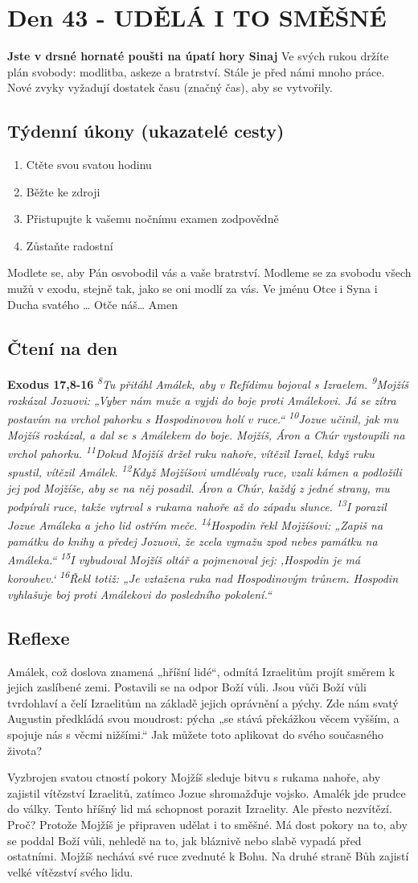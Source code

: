 \documentclass[11pt]{article}
\newcommand{\zacatekSedmyTyden}{
  \textbf{Jste v drsné hornaté poušti na úpatí hory Sinaj} \newline 
  Ve svých rukou držíte plán svobody: modlitba, askeze a bratrství. Stále je před námi mnoho práce. Nové zvyky vyžadují dostatek času (značný čas), aby se vytvořily.

  \subsection*{Týdenní úkony (ukazatelé cesty)}
\begin{enumerate}
  \item Ctěte svou svatou hodinu
  \item Běžte ke zdroji
  \item Přistupujte k vašemu nočnímu examen zodpovědně
  \item Zůstaňte radostní
\end{enumerate}
Modlete se, aby Pán osvobodil vás a vaše bratrství. \newline
Modleme se za svobodu všech mužů v exodu, stejně tak, jako se oni modlí za vás.\newline
Ve jménu Otce i Syna i Ducha svatého …  Otče náš… Amen
}
\begin{document}
\newpage
\section{Den 43 - UDĚLÁ I TO SMĚŠNÉ }
\zacatekSedmyTyden
\subsection*{Čtení na den}
\textbf{Exodus 17,8-16}
\newline
\textit{
\textsuperscript{8}Tu přitáhl Amálek, aby v Refídimu bojoval s Izraelem.
\textsuperscript{9}Mojžíš rozkázal Jozuovi: „Vyber nám muže a vyjdi do boje proti Amálekovi. Já se zítra postavím na vrchol pahorku s Hospodinovou holí v ruce.“
\textsuperscript{10}Jozue učinil, jak mu Mojžíš rozkázal, a dal se s Amálekem do boje. Mojžíš, Áron a Chúr vystoupili na vrchol pahorku.
\textsuperscript{11}Dokud Mojžíš držel ruku nahoře, vítězil Izrael, když ruku spustil, vítězil Amálek.
\textsuperscript{12}Když Mojžíšovi umdlévaly ruce, vzali kámen a podložili jej pod Mojžíše, aby se na něj posadil. Áron a Chúr, každý z jedné strany, mu podpírali ruce, takže vytrval s rukama nahoře až do západu slunce.
\textsuperscript{13}I porazil Jozue Amáleka a jeho lid ostřím meče.
\textsuperscript{14}Hospodin řekl Mojžíšovi: „Zapiš na památku do knihy a předej Jozuovi, že zcela vymažu zpod nebes památku na Amáleka.“
\textsuperscript{15}I vybudoval Mojžíš oltář a pojmenoval jej: ‚Hospodin je má korouhev.‘
\textsuperscript{16}Řekl totiž: „Je vztažena ruka nad Hospodinovým trůnem. Hospodin vyhlašuje boj proti Amálekovi do posledního pokolení.“
}

\subsection*{Reflexe}

Amálek, což doslova znamená „hříšní lidé“, odmítá Izraelitům projít směrem k jejich zaslíbené zemi. Postavili
se na odpor Boží vůli. Jsou vůči Boží vůli tvrdohlaví a čelí Izraelitům na základě jejich oprávnění a pýchy. Zde
nám svatý Augustin předkládá svou moudrost: pýcha „se stává překážkou věcem vyšším, a spojuje nás s věcmi
nižšími.“ Jak můžete toto aplikovat do svého současného života?

Vyzbrojen svatou ctností pokory Mojžíš sleduje bitvu s rukama nahoře, aby zajistil vítězství Izraelitů, zatímco
Jozue shromažďuje vojsko. Amalék jde prudce do války. Tento hříšný lid má schopnost porazit Izraelity. Ale
přesto nezvítězí. Proč? Protože Mojžíš je připraven udělat i to směšné. Má dost pokory na to, aby se poddal
Boží vůli, nehledě na to, jak bláznivě nebo slabě vypadá před ostatními. Mojžíš nechává své ruce zvednuté
k Bohu. Na druhé straně Bůh zajistí velké vítězství svého lidu.
\end{document}
